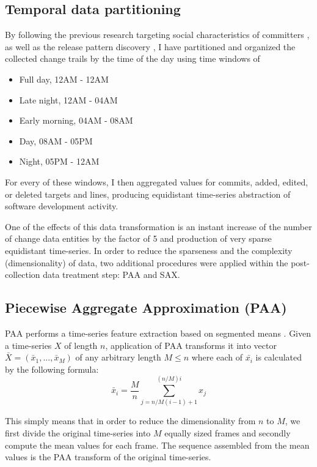 \documentclass[conference]{worldcomp}
\begin{document}
\subsection{Temporal data partitioning} \label{partitioning}
By following the previous research targeting social characteristics of committers \cite{citeulike:10392277}, 
as well as the release pattern discovery \cite{citeulike:10377366}, I have partitioned and organized 
the collected change trails by the time of the day using time windows of
\begin{itemize}
    \item Full day, 12AM - 12AM
    \item Late night, 12AM - 04AM  
    \item Early morning, 04AM - 08AM  
    \item Day, 08AM - 05PM  
    \item Night, 05PM - 12AM
\end{itemize}
For every of these windows, I then aggregated values for commits, added, edited, or deleted 
targets and lines, producing equidistant time-series abstraction of software development activity.

One of the effects of this data transformation is an instant increase of the number of
change data entities by the factor of 5 and production of very sparse equidistant time-series.
In order to reduce the sparseness and the complexity (dimensionality) of data, 
two additional procedures were applied within the post-collection data treatment step: PAA and SAX.

\subsection{Piecewise Aggregate Approximation (PAA)} \label{paa}
PAA performs a time-series feature extraction based on segmented means \cite{citeulike:2946589}. 
Given a time-series $X$ 
of length $n$, application of PAA transforms it into vector $\bar{X} = ( \bar{x}_{1}, ..., \bar{x}_{M} )$ of 
any arbitrary length $M \leq n$ where each of $\bar{x_{i}}$ is calculated by the following formula:
\begin{equation}
\bar{x}_{i} = \frac{M}{n} \sum_{j=n/M(i-1)+1}^{(n/M)i} x_{j}
\label{eq:paa}
\end{equation}

This simply means that in order to reduce the dimensionality from $n$ to $M$, 
we first divide the original time-series into $M$ equally sized frames and secondly compute the mean 
values for each frame. The sequence assembled from the mean values is the PAA transform of 
the original time-series. 
\end{document}
